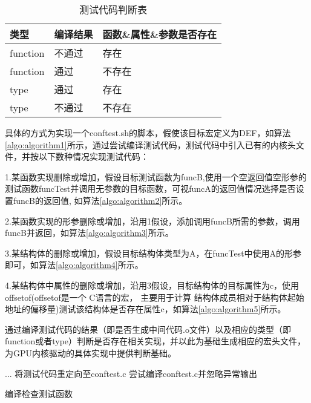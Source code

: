 \begin{table}[h]
  \centering
  \caption{测试代码判断表}
  \label{tab:测试代码判断表}
  \begin{tabular}{lll}
    \toprule
    类型   &   编译结果 & 函数\&属性\&参数是否存在    \\
    \midrule
    function & 不通过 & 存在 \\
    function & 通过 & 不存在 \\
    type & 通过 & 存在 \\
    type & 不通过 & 不存在 \\
    \bottomrule
  \end{tabular}
\end{table}

具体的方式为实现一个conftest.sh的脚本，假使该目标宏定义为DEF，如算法\ref{algo:algorithm1}所示，通过尝试编译测试代码，测试代码中引入已有的内核头文件，并按以下数种情况实现测试代码：

1.某函数实现删除或增加，假设目标测试函数为funcB,使用一个空返回值空形参的测试函数funcTest并调用无参数的目标函数，可视funcA的返回值情况选择是否设置funcB的返回值,
如算法\ref{algo:algorithm2}所示。

2.某函数实现的形参删除或增加，沿用1假设，添加调用funcB所需的参数，调用funcB并返回，如算法\ref{algo:algorithm3}所示。

3.某结构体的删除或增加，假设目标结构体类型为A，在funcTest中使用A的形参即可，如算法\ref{algo:algorithm4}所示。

4.某结构体中属性的删除或增加，沿用3假设，目标结构体的目标属性为c，使用offsetof(offsetof是一个 C语言的宏，
主要用于计算 结构体成员相对于结构体起始地址的偏移量)测试该结构体是否存在属性c，如算法\ref{algo:algorithm5}所示。

通过编译测试代码的结果（即是否生成中间代码.o文件）以及相应的类型（即function或者type）判断是否存在相关实现，并以此为基础生成相应的宏头文件，为GPU内核驱动的具体实现中提供判断基础。

\begin{algorithm}[h]
  \SetAlgoLined
  ...\;
  将测试代码重定向至conftest.c\;
  尝试编译conftest.c并忽略异常输出\;
  \caption{编译检查测试函数}
  \label{algo:algorithm1}
\end{algorithm}

